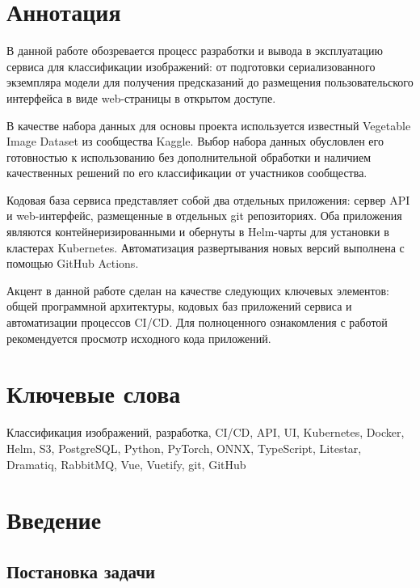 \documentclass[a4paper,12pt]{extarticle}
\begin{document}
\newpage
\setcounter{page}{2}

{
	\hypersetup{linkcolor=black}
	\tableofcontents
}

\newpage

\newpage
\section*{Аннотация}   %
В данной работе обозревается процесс разработки и вывода в эксплуатацию сервиса для классификации
изображений: от подготовки сериализованного экземпляра модели для получения предсказаний до
размещения пользовательского интерфейса в виде web-страницы в открытом доступе.

В качестве набора данных для основы проекта используется известный Vegetable Image Dataset из
сообщества Kaggle. Выбор набора данных обусловлен его готовностью к использованию без дополнительной
обработки и наличием качественных решений по его классификации от участников сообщества.

Кодовая база сервиса представляет собой два отдельных приложения: сервер API и web-интерфейс,
размещенные в отдельных git репозиториях. Оба приложения являются контейнеризированными и обернуты в
Helm-чарты для установки в кластерах Kubernetes. Автоматизация развертывания новых версий выполнена
с помощью GitHub Actions.

Акцент в данной работе сделан на качестве следующих ключевых элементов: общей программной архитектуры,
кодовых баз приложений сервиса и автоматизации процессов CI/CD. Для полноценного ознакомления с
работой рекомендуется просмотр исходного кода приложений.


\section*{Ключевые слова}
Классификация изображений, разработка, CI/CD, API, UI, Kubernetes, Docker, Helm, S3, PostgreSQL,
Python, PyTorch, ONNX, TypeScript, Litestar, Dramatiq, RabbitMQ, Vue, Vuetify, git, GitHub
\pagebreak

\section{Введение}

\subsection{Постановка задачи}
\end{document}
